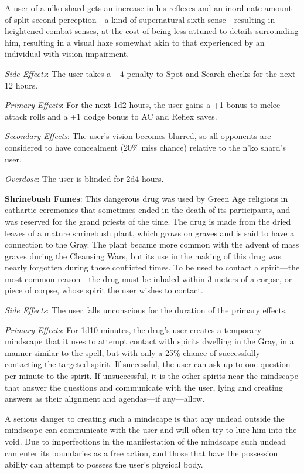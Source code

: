 A user of a n'ko shard gets an increase in his reflexes and an inordinate amount of split-second perception---a kind of supernatural sixth sense---resulting in heightened combat senses, at the cost of being less attuned to details surrounding him, resulting in a visual haze somewhat akin to that experienced by an individual with vision impairment.

\textit{Side Effects}: The user takes a $-4$ penalty to Spot and Search checks for the next 12 hours.

\textit{Primary Effects}: For the next 1d2 hours, the user gains a +1 bonus to melee attack rolls and a +1 dodge bonus to AC and Reflex saves.

\textit{Secondary Effects}: The user's vision becomes blurred, so all opponents are considered to have concealment (20\% miss chance) relative to the n'ko shard's user.

\textit{Overdose}: The user is blinded for 2d4 hours.

\textbf{Shrinebush Fumes}: This dangerous drug was used by Green Age religions in cathartic ceremonies that sometimes ended in the death of its participants, and was reserved for the grand priests of the time. The drug is made from the dried leaves of a mature shrinebush plant, which grows on graves and is said to have a connection to the Gray. The plant became more common with the advent of mass graves during the Cleansing Wars, but its use in the making of this drug was nearly forgotten during those conflicted times. To be used to contact a spirit---the most common reason---the drug must be inhaled within 3 meters of a corpse, or piece of corpse, whose spirit the user wishes to contact.

\textit{Side Effects}: The user falls unconscious for the duration of the primary effects.

\textit{Primary Effects}: For 1d10 minutes, the drug's user creates a temporary mindscape that it uses to attempt contact with spirits dwelling in the Gray, in a manner similar to the  spell, but with only a 25\% chance of successfully contacting the targeted spirit. If successful, the user can ask up to one question per minute to the spirit. If unsuccessful, it is the other spirits near the mindscape that answer the questions and communicate with the user, lying and creating answers as their alignment and agendas---if any---allow.

A serious danger to creating such a mindscape is that any undead outside the mindscape can communicate with the user and will often try to lure him into the void. Due to imperfections in the manifestation of the mindscape such undead can enter its boundaries as a free action, and those that have the possession ability can attempt to possess the user's physical body.

